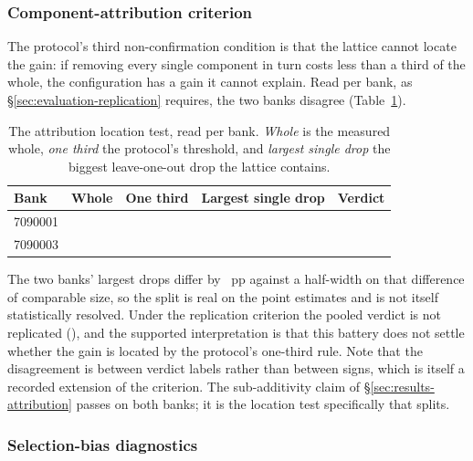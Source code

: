 \subsubsection{Component-attribution criterion}
\label{sec:results-location}

The protocol's third non-confirmation condition is that the lattice cannot locate the gain: if
removing every single component in turn costs less than a third of the whole, the configuration has a
gain it cannot explain. Read per bank, as \S\ref{sec:evaluation-replication} requires, the two banks
disagree (Table~\ref{tab:location}).

\begin{table}[!ht]\centering
\caption{The attribution location test, read per bank. \emph{Whole} is the measured whole,
\emph{one third} the protocol's threshold, and \emph{largest single drop} the biggest
leave-one-out drop the lattice contains.}
\label{tab:location}
{\tabfont
\begin{tabular}{lrrlc}
\toprule
Bank & Whole & One third & Largest single drop & Verdict \\
\midrule
7090001 & \vsevenLocWholeOne{} & \vsevenLocThirdOne{} & \texttt{\vsevenLocAtOne{}} \vsevenLocBiggestOne{} & \vsevenLocVerdictOne{} \\
7090003 & \vsevenLocWholeThree{} & \vsevenLocThirdThree{} & \texttt{\vsevenLocAtThree{}} \vsevenLocBiggestThree{} & \vsevenLocVerdictThree{} \\
\bottomrule
\end{tabular}}
\end{table}

The two banks' largest drops differ by \vsevenLocSplit{}~pp against a half-width on that difference of
comparable size, so the split is real on the point estimates and is not itself statistically resolved.
Under the replication criterion the pooled verdict is not replicated
(\vsevenLocReplicates{}), and the supported interpretation is that this battery does not settle
whether the gain is located by the protocol's one-third rule. Note that the disagreement is between verdict labels
rather than between signs, which is itself a recorded extension of the criterion. The sub-additivity
claim of \S\ref{sec:results-attribution} passes on both banks; it is the location test specifically
that splits.

\subsubsection{Selection-bias diagnostics}
\label{sec:results-selection}

